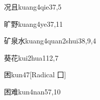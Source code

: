 \begin{entry}{况且}{kuang4qie3}{7,5}
\end{entry}

\begin{entry}{旷野}{kuang4ye3}{7,11}
\end{entry}

\begin{entry}{矿泉水}{kuang4quan2shui3}{8,9,4}
\end{entry}

\begin{entry}{葵花}{kui2hua1}{12,7}
\end{entry}

\begin{entry}{困}{kun4}{7}[Radical ⼞]
\end{entry}

\begin{entry}{困难}{kun4nan5}{7,10}
\end{entry}


